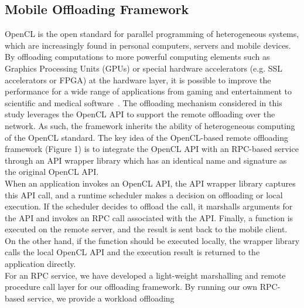 \documentclass[10pt, conference, compsocconf]{IEEEtran}
\begin{document}
\subsection{Mobile Offloading Framework}
OpenCL is the open standard for parallel programming of heterogeneous
systems, which are increasingly found in personal computers, servers and
mobile devices.
%
By offloading computations to more powerful computing
elements such as Graphics Processing Units (GPUs) or special hardware
accelerators (e.g. SSL accelerators or FPGA) at the hardware layer,
it is possible to improve the performance for a wide range of
applications from gaming and entertainment to scientific and medical
software~\cite{opencl}.
%
The offloading mechanism considered in this study leverages the OpenCL
API to support the remote offloading over the network.
%
As such, the framework inherits the ability of heterogeneous computing of 
the OpenCL standard. 
%
The key idea of the OpenCL-based remote offloading framework (Figure 1) is to
integrate the OpenCL API with an RPC-based service through an API wrapper
library which has an identical name and signature as the original OpenCL
API.\\
%
%
\indent When an application invokes an OpenCL API, the API wrapper
library captures this API call, and a runtime scheduler makes a decision
on offloading or local execution.
%
If the scheduler decides to offload the call, it marshalls arguments
for the API and invokes an RPC call associated with the API.
%
Finally, a function is executed on the remote server, and the result is
sent back to the mobile client.
%
On the other hand, if the function should be executed locally, the wrapper
library calls the local OpenCL API and the execution result is returned
to the application directly.\\
%
%
%
\indent For an RPC service, we have developed a light-weight marshalling and remote
procedure call layer for our offloading framework.
%
By running our own RPC-based service, we provide a workload offloading
\end{document}
